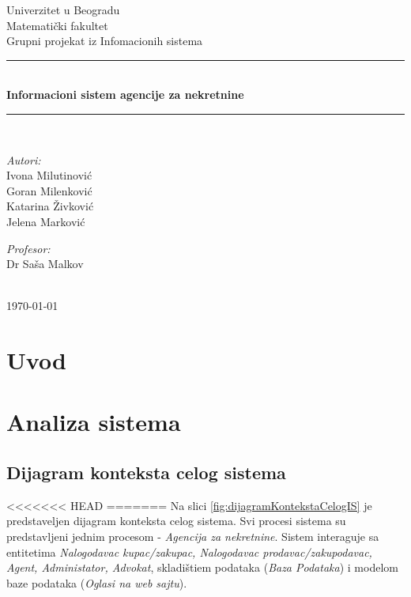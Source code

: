 \documentclass{article}
\begin{document}
\begin{titlepage}

\newcommand{\HRule}{\rule{\linewidth}{0.5mm}}
\center
\textup{\Large Univerzitet u Beogradu\\Matemati\v{c}ki fakultet}\\[1.5cm]
\textup{\Large Grupni projekat iz Infomacionih sistema}\\[0.4cm]

\HRule \\[0.4cm]
{ \huge \bfseries Informacioni sistem agencije za nekretnine}\\[0.4cm]
\HRule \\[8.5cm]

\begin{minipage}{0.4\textwidth}
\begin{flushleft}
\large
\emph{Autori:}\\
\textup Ivona Milutinovi\' c\\
\textup Goran Milenkovi\' c\\
\textup Katarina \v Zivkovi\' c\\
\textup Jelena Markovi\' c

\end{flushleft}
\end{minipage}
\hfill
\begin{minipage}{0.4\textwidth}
\begin{flushright}
\large
\emph{Profesor:} \\
\textup Dr Sa\v sa Malkov\\
\end{flushright}
\end{minipage}\\[2cm]


{\textup \large \today}\\[1cm]

\end{titlepage}

\newpage
\tableofcontents

\newpage
\section{\bfseries Uvod}

\newpage
\section{\bfseries Analiza sistema}

\subsection{\bfseries Dijagram konteksta celog sistema}
<<<<<<< HEAD
=======
Na slici \ref{fig:dijagramKontekstaCelogIS} je predstaveljen dijagram konteksta celog sistema. Svi procesi sistema su predstavljeni jednim procesom - {\it Agencija za nekretnine}. Sistem interaguje sa entitetima {\it Nalogodavac kupac/zakupac, Nalogodavac prodavac/zakupodavac, Agent, Administator, Advokat}, skladi\v{s}tiem podataka ({\it Baza Podataka}) i modelom baze podataka ({\it Oglasi na web sajtu}).
\end{document}
